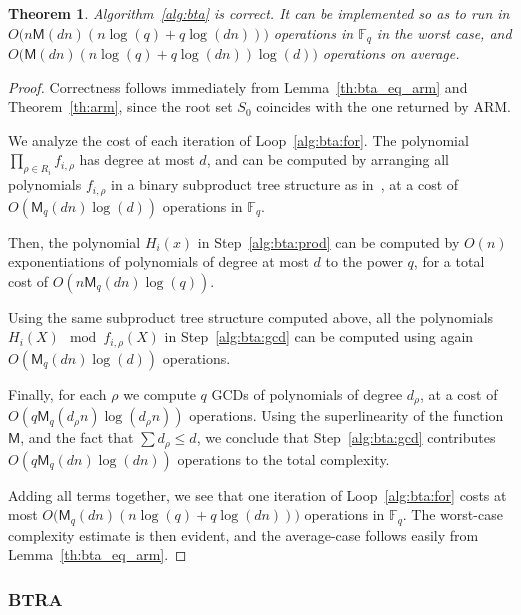 \documentclass{article}
\newcommand{\ff}[1]{\mathbb{F}_{#1}}
\newcommand{\qq}{q}
\newcommand{\basef}{\ff{\qq}}
\newcommand{\Mul}{\mathsf{M}}
\newtheorem{Theo}{Theorem}
\newcommand{\Notes}[1]{\textcolor{red}{Note: #1}}
\begin{document}
\begin{Theo}
  Algorithm~\ref{alg:bta} is correct. It can be implemented so as to run in
  $O\bigl(n\Mul(dn)(n\log(q) + q\log(dn))\bigr)$ operations in
  $\basef$ in the worst case, and
  $O\bigl(\Mul(dn)(n\log(q) + q\log(dn))\log(d)\bigr)$ operations on
  average.
\end{Theo}
\begin{proof}
  Correctness follows immediately from Lemma~\ref{th:bta_eq_arm} and
  Theorem~\ref{th:arm}, since the root set $S_0$ coincides with the one
  returned by ARM.

  We analyze the cost of each iteration of
  Loop~\ref{alg:bta:for}. The polynomial
  $\prod_{\rho\in R_i}f_{i,\rho}$ has degree at most $d$, and can be
  computed by arranging all polynomials $f_{i,\rho}$ in a binary
  subproduct tree structure as in~\cite[Lemma~10.4]{Gathen2003}, at a
  cost of $O(\Mul_q(dn)\log(d))$ operations in $\basef$.
  
  Then, the polynomial $H_i(x)$ in Step~\ref{alg:bta:prod} can be
  computed by $O(n)$ exponentiations of polynomials of degree at most
  $d$ to the power $q$, for a total cost of $O(n\Mul_q(dn)\log(q))$.

  Using the same subproduct tree structure computed above, all the
  polynomials $H_i(X)\mod f_{i,\rho}(X)$ in Step~\ref{alg:bta:gcd} can
  be computed using again $O(\Mul_q(dn)\log(d))$ operations. 

  Finally, for each $\rho$ we compute $q$ GCDs of polynomials of
  degree $d_\rho$, at a cost of $O(q\Mul_q(d_\rho n)\log(d_\rho n))$
  operations. Using the superlinearity of the function $\Mul$, and the
  fact that $\sum d_\rho \le d$, we conclude that
  Step~\ref{alg:bta:gcd} contributes $O(q\Mul_q(dn)\log(dn))$
  operations to the total complexity.
  
  Adding all terms together, we see that one iteration of
  Loop~\ref{alg:bta:for} costs at most
  $O\bigl(\Mul_q(dn)(n\log(q) + q\log(dn))\bigr)$ operations in
  $\basef$. The worst-case complexity estimate is then evident, and
  the average-case follows easily from Lemma~\ref{th:bta_eq_arm}.
\end{proof}



\subsubsection{BTRA}
\end{document}
